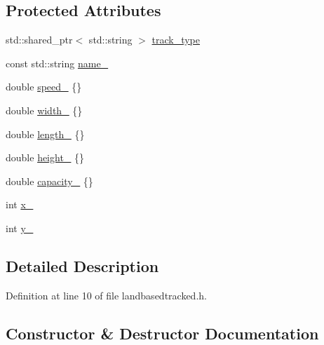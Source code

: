 \subsection*{Protected Attributes}
\begin{DoxyCompactItemize}
\item 
std\+::shared\+\_\+ptr$<$ std\+::string $>$ \hyperlink{classrwa3_1_1_land_based_tracked_ae57d4a2861a045e2f0cc0da1e43868ed}{track\+\_\+type}
\item 
const std\+::string \hyperlink{classrwa3_1_1_land_based_tracked_ad7f474b8339e04a7b8a174b2366aee1b}{name\+\_\+}
\item 
double \hyperlink{classrwa3_1_1_land_based_tracked_a2bc2f3ff33c23a6eca670f2ee347508e}{speed\+\_\+} \{\}
\item 
double \hyperlink{classrwa3_1_1_land_based_tracked_a61f588ad9505ec4774568327620fba53}{width\+\_\+} \{\}
\item 
double \hyperlink{classrwa3_1_1_land_based_tracked_aa97c13720453621211935e0e96ba3790}{length\+\_\+} \{\}
\item 
double \hyperlink{classrwa3_1_1_land_based_tracked_a5e829ff7fae33fb1c29f5897c09311c8}{height\+\_\+} \{\}
\item 
double \hyperlink{classrwa3_1_1_land_based_tracked_a5b9e38961ec5d2850b9bd069e897f3cd}{capacity\+\_\+} \{\}
\item 
int \hyperlink{classrwa3_1_1_land_based_tracked_ad52ad096c20dd018142510ce1a872ba6}{x\+\_\+}
\item 
int \hyperlink{classrwa3_1_1_land_based_tracked_aa6273b2cfff5572934f132cf0ada463e}{y\+\_\+}
\end{DoxyCompactItemize}


\subsection{Detailed Description}


Definition at line 10 of file landbasedtracked.\+h.



\subsection{Constructor \& Destructor Documentation}
\mbox{\label{classrwa3_1_1_land_based_tracked_a7afa1f901374a08d0bb23882988eef46}} 
